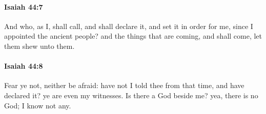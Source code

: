 		\paragraph{Isaiah 44:7} %
			\label{ISAIAH-44-7}

			And who, as I, shall call, and shall declare it, and set it in order for me, since I appointed the ancient people? and the things that are coming, and shall come, let them shew unto them.


		\paragraph{Isaiah 44:8} %
			\label{ISAIAH-44-8}

			Fear ye not, neither be afraid: have not I told thee from that time, and have declared it? ye are even my witnesses. Is there a God beside me? yea, there is no God; I know not any.


